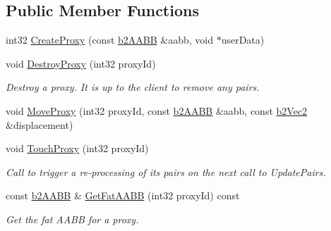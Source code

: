 \subsection*{Public Member Functions}
\begin{DoxyCompactItemize}
\item 
int32 \mbox{\hyperlink{classb2BroadPhase_ae2f7af756bc55ece45221466c5af449c}{Create\+Proxy}} (const \mbox{\hyperlink{structb2AABB}{b2\+A\+A\+BB}} \&aabb, void $\ast$user\+Data)
\item 
\mbox{\label{classb2BroadPhase_a84f0fb227dc01a9b9baa55c7b8c68984}} 
void \mbox{\hyperlink{classb2BroadPhase_a84f0fb227dc01a9b9baa55c7b8c68984}{Destroy\+Proxy}} (int32 proxy\+Id)
\begin{DoxyCompactList}\small\item\em Destroy a proxy. It is up to the client to remove any pairs. \end{DoxyCompactList}\item 
void \mbox{\hyperlink{classb2BroadPhase_a01dc18a19c2b5d0cc1d9cd8c8554234c}{Move\+Proxy}} (int32 proxy\+Id, const \mbox{\hyperlink{structb2AABB}{b2\+A\+A\+BB}} \&aabb, const \mbox{\hyperlink{structb2Vec2}{b2\+Vec2}} \&displacement)
\item 
\mbox{\label{classb2BroadPhase_a67b296431ebbc7b44037f21d645d9166}} 
void \mbox{\hyperlink{classb2BroadPhase_a67b296431ebbc7b44037f21d645d9166}{Touch\+Proxy}} (int32 proxy\+Id)
\begin{DoxyCompactList}\small\item\em Call to trigger a re-\/processing of it\textquotesingle{}s pairs on the next call to Update\+Pairs. \end{DoxyCompactList}\item 
\mbox{\label{classb2BroadPhase_af5c47c036ca67d44676ea3cec73ae3d8}} 
const \mbox{\hyperlink{structb2AABB}{b2\+A\+A\+BB}} \& \mbox{\hyperlink{classb2BroadPhase_af5c47c036ca67d44676ea3cec73ae3d8}{Get\+Fat\+A\+A\+BB}} (int32 proxy\+Id) const
\begin{DoxyCompactList}\small\item\em Get the fat A\+A\+BB for a proxy. \end{DoxyCompactList}\item 
\mbox{\label{classb2BroadPhase_a3b85893e3cf18b43087cb96b0b9076d1}} 

\end{DoxyCompactItemize}
